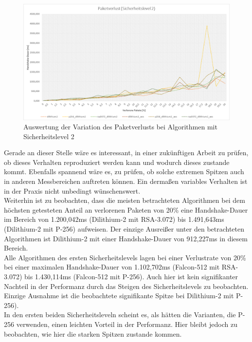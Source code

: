 		\begin{figure}[htbp]
			\centering
			\includegraphics[width=\textwidth]{../auswertung/verlust_sl2.png}
			\caption{Auswertung der Variation des Paketverlusts bei Algorithmen mit Sicherheitslevel 2}
			\label{fig:ergebnis:verlust:sl2}
		\end{figure}
		
		Gerade an dieser Stelle wäre es interessant, in einer zukünftigen Arbeit zu prüfen, ob dieses Verhalten reproduziert werden kann und wodurch dieses 			zustande kommt. Ebenfalls spannend wäre es, zu prüfen, ob solche extremen Spitzen auch in anderen Messbereichen auftreten können. Ein dermaßen 					variables Verhalten ist in der Praxis nicht unbedingt wünschenswert.\\
		
		Weiterhin ist zu beobachten, dass die meisten betrachteten Algorithmen bei dem höchsten getesteten Anteil an verlorenen Paketen von 20\% eine 					Handshake-Dauer im Bereich von 1.200,042ms (Dilithium-2 mit RSA-3.072) bis 1.491,643ms (Dilithium-2 mit P-256) aufweisen. Der einzige Ausreißer 				unter den betrachteten Algorithmen ist Dilithium-2 mit einer Handshake-Dauer von 912,227ms in diesem Bereich.\\
		
		Alle Algorithmen des ersten Sicherheitslevels lagen bei einer Verlustrate von 20\% bei einer maximalen Handshake-Dauer von 1.102,702ms (Falcon-512 				mit RSA-3.072) bis 1.430,114ms (Falcon-512 mit P-256). Auch hier ist kein signifikanter Nachteil in der Performanz durch das Steigen des 						Sicherheitslevels zu beobachten. Einzige Ausnahme ist die beobachtete signifikante Spitze bei Dilithium-2 mit P-256).\\
		
		In den ersten beiden Sicherheitsleveln scheint es, als hätten die Varianten, die P-256 verwenden, einen leichten Vorteil in der Performanz. Hier 				bleibt jedoch zu beobachten, wie hier die starken Spitzen zustande kommen.
		

